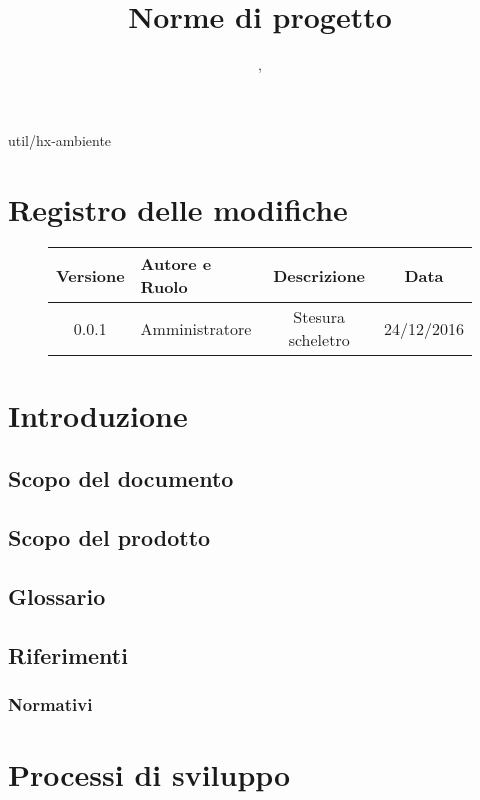 
 {util/hx-ambiente}
\author{\GG, \MM}
\supervisor{\LB, \AZ}
\title{ Norme di progetto}

\renewcommand{\arraystretch}{1.5}
\setcounter{tocdepth}{4}
\setcounter{secnumdepth}{4}


\maketitle
	\section*{Registro delle modifiche}
	\begin{figure}[htb]
	\centering
	\begin{tabular}{cp{3cm}cc}
	Versione & Autore e Ruolo          & Descrizione       & Data       \\ \hline
	0.0.1    & {\MM} Amministratore & Stesura scheletro & 24/12/2016 \\ \hline
	\end{tabular}
	\end{figure}
\tableofcontents

\section{Introduzione}
	\subsection{Scopo del documento}
	\subsection{Scopo del prodotto}
	\subsection{Glossario}
	\subsection{Riferimenti}
		\subsubsection{Normativi}
\section{Processi di sviluppo}
